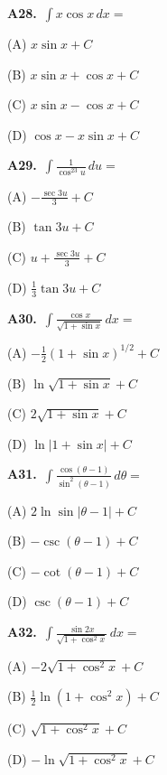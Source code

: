 \documentclass[11pt]{article}
\begin{document}
\bigskip\noindent\textbf{A28.}\ $\displaystyle\int x\cos x\,dx=$
\begin{list}{}{\setlength{\leftmargin}{3em}\setlength{\labelwidth}{2.5em}\setlength{\itemsep}{0pt}\setlength{\topsep}{2pt}}
\item[(A)] $x\sin x+C$
\item[(B)] $x\sin x+\cos x+C$
\item[(C)] $x\sin x-\cos x+C$
\item[(D)] $\cos x-x\sin x+C$
\end{list}

\bigskip\noindent\textbf{A29.}\ $\displaystyle\int \frac1{\cos^23u}\,du=$
\begin{list}{}{\setlength{\leftmargin}{3em}\setlength{\labelwidth}{2.5em}\setlength{\itemsep}{0pt}\setlength{\topsep}{2pt}}
\item[(A)] $-\frac{\sec3u}3+C$
\item[(B)] $\tan3u+C$
\item[(C)] $u+\frac{\sec3u}3+C$
\item[(D)] $\frac13\tan3u+C$
\end{list}

\bigskip\noindent\textbf{A30.}\ $\displaystyle\int \frac{\cos x}{\sqrt{1+\sin x}}\,dx=$
\begin{list}{}{\setlength{\leftmargin}{3em}\setlength{\labelwidth}{2.5em}\setlength{\itemsep}{0pt}\setlength{\topsep}{2pt}}
\item[(A)] $-\frac12(1+\sin x)^{1/2}+C$
\item[(B)] $\ln\sqrt{1+\sin x}+C$
\item[(C)] $2\sqrt{1+\sin x}+C$
\item[(D)] $\ln\lvert1+\sin x\rvert+C$
\end{list}

\bigskip\noindent\textbf{A31.}\ $\displaystyle\int \frac{\cos(\theta-1)}{\sin^2(\theta-1)}\,d\theta=$
\begin{list}{}{\setlength{\leftmargin}{3em}\setlength{\labelwidth}{2.5em}\setlength{\itemsep}{0pt}\setlength{\topsep}{2pt}}
\item[(A)] $2\ln\sin\lvert\theta-1\rvert+C$
\item[(B)] $-\csc(\theta-1)+C$
\item[(C)] $-\cot(\theta-1)+C$
\item[(D)] $\csc(\theta-1)+C$
\end{list}

\bigskip\noindent\textbf{A32.}\ $\displaystyle\int \frac{\sin2x}{\sqrt{1+\cos^2x}}\,dx=$
\begin{list}{}{\setlength{\leftmargin}{3em}\setlength{\labelwidth}{2.5em}\setlength{\itemsep}{0pt}\setlength{\topsep}{2pt}}
\item[(A)] $-2\sqrt{1+\cos^2x}+C$
\item[(B)] $\frac12\ln(1+\cos^2x)+C$
\item[(C)] $\sqrt{1+\cos^2x}+C$
\item[(D)] $-\ln\sqrt{1+\cos^2x}+C$
\end{list}
\end{document}
